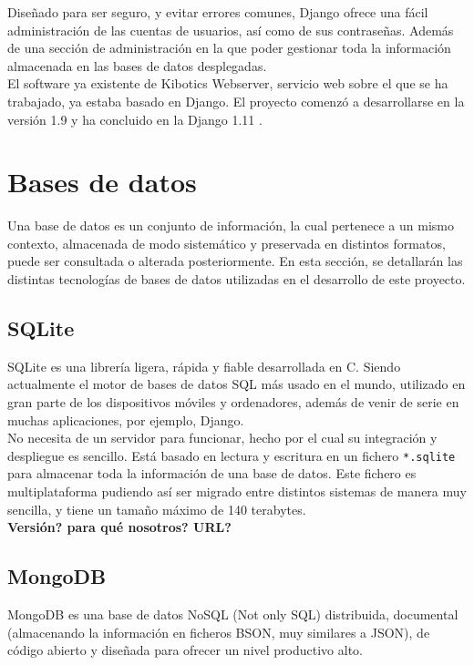 \documentclass[11pt,a4paper]{book}
\begin{document}
			 	Diseñado para ser seguro, y evitar errores comunes, Django ofrece una fácil administración de las cuentas de usuarios, así como de sus contraseñas. Además de una sección de administración en la que poder gestionar toda la información almacenada en las bases de datos desplegadas.\\
			 	
			 	
				El software ya existente de Kibotics Webserver, servicio web sobre el que se ha trabajado, ya estaba basado en Django. El proyecto comenzó a desarrollarse en la versión 1.9 y ha concluido en la Django 1.11  \cite{Django}.
											
				
		\section{Bases de datos}
			Una base de datos es un conjunto de información, la cual pertenece a un mismo contexto, almacenada de modo sistemático y preservada en distintos formatos, puede ser consultada o alterada posteriormente. En esta sección, se detallarán las distintas tecnologías de bases de datos utilizadas en el desarrollo de este proyecto.
			\subsection{SQLite}
				SQLite es una librería ligera, rápida y fiable desarrollada en C. Siendo actualmente el motor de bases de datos SQL más usado en el mundo, utilizado en gran parte de los dispositivos móviles y ordenadores, además de venir de serie en muchas aplicaciones, por ejemplo, Django.\\
				
				
				No necesita de un servidor para funcionar, hecho por el cual su integración y despliegue es sencillo. Está basado en lectura y escritura en un fichero \texttt{*.sqlite} para almacenar toda la información de una base de datos. Este fichero es multiplataforma pudiendo así ser migrado entre distintos sistemas de manera muy sencilla, y tiene un tamaño máximo de 140 terabytes.\\
								
				\textbf{Versión? para qué nosotros? URL?}
				
			\subsection{MongoDB}
				MongoDB \cite{MongoDB} es una base de datos NoSQL (Not only SQL) distribuida, documental (almacenando la información en ficheros BSON, muy similares a JSON), de código abierto y diseñada para ofrecer un nivel productivo alto.\\
				
\end{document}
